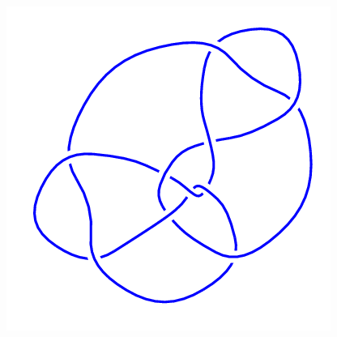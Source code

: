 \begin{figure}[H]
\begin{minipage}[b]{.18\linewidth}
	\end{minipage}
	\begin{minipage}[b]{.18\linewidth}
		\centering
		\includegraphics[width=\linewidth]{../data/10_96.png}
	\end{minipage}
\end{figure}
